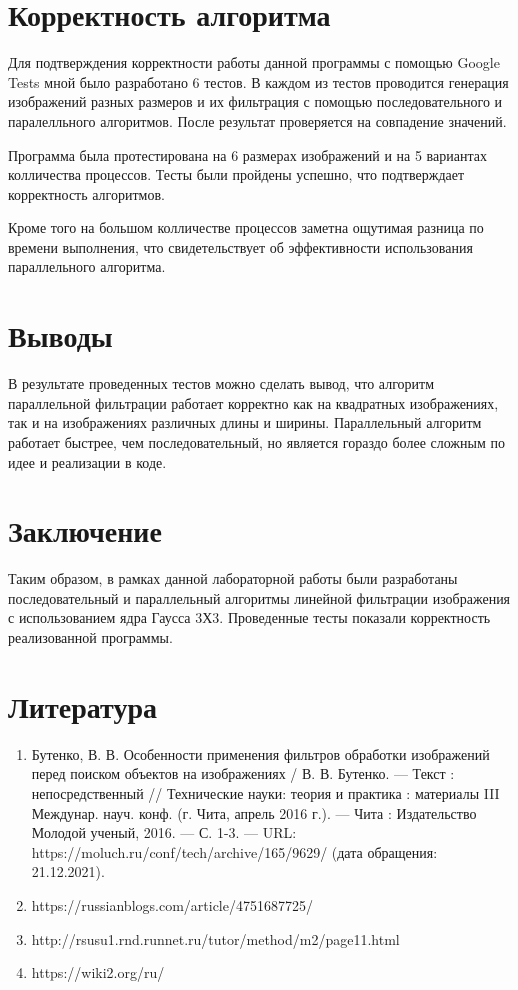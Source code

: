 \documentclass{report}
\begin{document}
\section*{Корректность алгоритма}
Для подтверждения корректности работы данной программы с помощью  Google Tests мной было разработано 6 тестов. В каждом из тестов проводится генерация изображений разных размеров и их фильтрация с помощью последовательного и паралелльного алгоритмов. После результат проверяется на совпадение значений.
\par Программа была протестирована на 6 размерах изображений и на 5 вариантах колличества процессов. Тесты были пройдены успешно, что подтверждает корректность алгоритмов.
\par Кроме того на большом колличестве процессов заметна ощутимая разница по времени выполнения, что свидетельствует об эффективности использования параллельного алгоритма.
\newpage


\section*{Выводы }
В результате проведенных тестов можно сделать вывод, что алгоритм параллельной фильтрации работает корректно как на квадратных изображениях, так и на изображениях различных длины и ширины. Параллельный алгоритм работает быстрее, чем последовательный, но является гораздо более сложным по идее и реализации в коде.

\section*{Заключение}
Таким образом, в рамках данной лабораторной работы были разработаны последовательный и параллельный алгоритмы линейной фильтрации изображения с использованием ядра Гаусса 3Х3. Проведенные тесты показали корректность реализованной программы.
\newpage


\section*{Литература}
\begin{enumerate}
\item Бутенко, В. В. Особенности применения фильтров обработки изображений перед поиском объектов на изображениях / В. В. Бутенко. — Текст : непосредственный // Технические науки: теория и практика : материалы III Междунар. науч. конф. (г. Чита, апрель 2016 г.). — Чита : Издательство Молодой ученый, 2016. — С. 1-3. — URL: https://moluch.ru/conf/tech/archive/165/9629/ (дата обращения: 21.12.2021).
\item https://russianblogs.com/article/4751687725/
\item http://rsusu1.rnd.runnet.ru/tutor/method/m2/page11.html
\item https://wiki2.org/ru/%
\end{enumerate} 
\newpage
\end{document}
